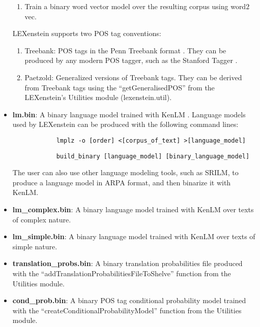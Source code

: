 \begin{itemize}
\begin{enumerate}
			\item Train a binary word vector model over the resulting corpus using word$2$vec.
		\end{enumerate}
		
		LEXenstein supports two POS tag conventions:
		
			\begin{enumerate}
				\item Treebank: POS tags in the Penn Treebank format \cite{Marcus1993}. They can be produced by any modern POS tagger, such as the Stanford Tagger \cite{stanfordparser}.
				
				\item Paetzold: Generalized versions of Treebank tags. They can be derived from Treebank tags using the ``getGeneralisedPOS'' from the LEXenstein's Utilities module (lexenstein.util).
			\end{enumerate}
	
	\item \textbf{lm.bin}: A binary language model trained with KenLM \cite{kenlm}. Language models used by LEXenstein can be produced with the following command lines:

			\begin{lstlisting}
			lmplz -o [order] <[corpus_of_text] >[language_model]
			\end{lstlisting}
			\begin{lstlisting}
			build_binary [language_model] [binary_language_model]
			\end{lstlisting}
			
		The user can also use other language modeling tools, such as SRILM, to produce a language model in ARPA format, and then binarize it with KenLM.
		
	
	\item \textbf{lm\_complex.bin}: A binary language model trained with KenLM \cite{kenlm} over texts of complex nature.
	
	\item \textbf{lm\_simple.bin}: A binary language model trained with KenLM \cite{kenlm} over texts of simple nature.
	
	
	\item \textbf{translation\_probs.bin}: A binary translation probabilities file produced with the ``addTranslationProbabilitiesFileToShelve'' function from the Utilities module.
	
	\item \textbf{cond\_prob.bin}: A binary POS tag conditional probability model trained with the ``createConditionalProbabilityModel'' function from the Utilities module.
	

\end{itemize}
